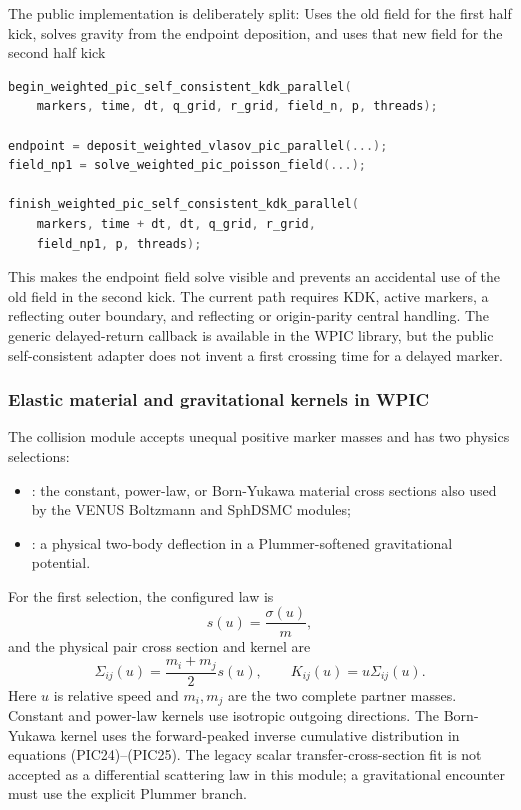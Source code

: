 The public implementation is deliberately split:
{}
{Uses the old field for the first half kick, solves gravity from the endpoint
 deposition, and uses that new field for the second half kick}
\begin{lstlisting}[language=C++]
begin_weighted_pic_self_consistent_kdk_parallel(
    markers, time, dt, q_grid, r_grid, field_n, p, threads);

endpoint = deposit_weighted_vlasov_pic_parallel(...);
field_np1 = solve_weighted_pic_poisson_field(...);

finish_weighted_pic_self_consistent_kdk_parallel(
    markers, time + dt, dt, q_grid, r_grid,
    field_np1, p, threads);
\end{lstlisting}
This makes the endpoint field solve visible and prevents an accidental use of
the old field in the second kick.  The current path requires KDK, active
markers, a reflecting outer boundary, and reflecting or origin-parity central
handling.  The generic delayed-return callback is available in the WPIC
library, but the public self-consistent adapter does not invent a first
crossing time for a delayed marker.

\subsubsection{Elastic material and gravitational kernels in WPIC}

The collision module accepts unequal positive marker masses and has two
physics selections:
\begin{itemize}
\item {}: the constant, power-law, or Born-Yukawa
material cross sections also used by the VENUS Boltzmann and SphDSMC modules;
\item {}: a physical two-body deflection in a
Plummer-softened gravitational potential.
\end{itemize}
For the first selection, the configured law is
\[
 s(u)=\frac{\sigma(u)}{m},
\]
and the physical pair cross section and kernel are
\[
 \Sigma_{ij}(u)=\frac{m_i+m_j}{2}s(u),\qquad
 K_{ij}(u)=u\Sigma_{ij}(u).                               \tag{PIC26a}
\]
Here \(u\) is relative speed and \(m_i,m_j\) are the two complete partner
masses.  Constant and power-law kernels use isotropic
outgoing directions.  The Born-Yukawa kernel uses the forward-peaked inverse
cumulative distribution in equations (PIC24)--(PIC25).  The legacy scalar
 transfer-cross-section fit is not accepted as a
differential scattering law in this module; a gravitational encounter must
use the explicit Plummer branch.

